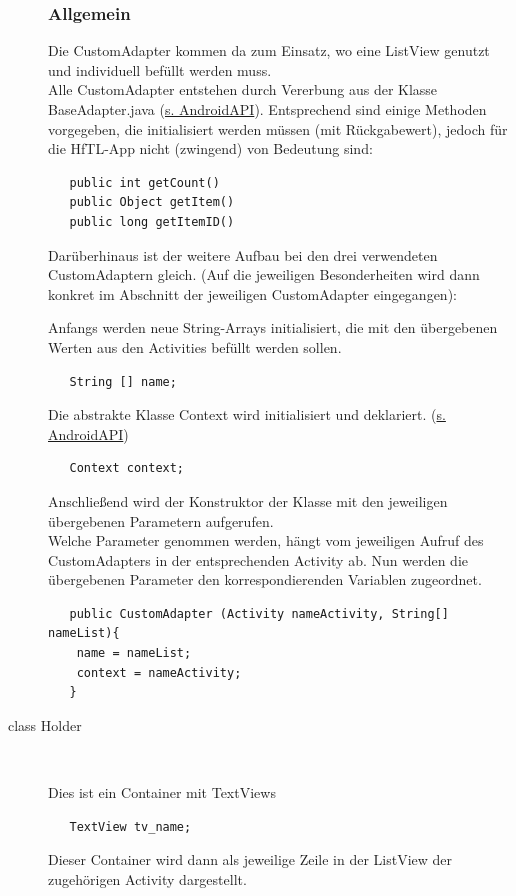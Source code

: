 \begin{description}
\subsubsection{Allgemein} 
Die CustomAdapter kommen da zum Einsatz, wo eine ListView genutzt und individuell befüllt werden muss. \\
Alle CustomAdapter entstehen durch Vererbung aus der Klasse BaseAdapter.java (\href{http://developer.android.com/reference/android/widget/BaseAdapter.html}{s. AndroidAPI}). Entsprechend sind einige Methoden vorgegeben, die initialisiert werden müssen (mit Rückgabewert), jedoch für die HfTL-App nicht (zwingend) von Bedeutung sind:
\begin{lstlisting}
   public int getCount()
   public Object getItem()
   public long getItemID()
\end{lstlisting}

Darüberhinaus ist der weitere Aufbau bei den drei verwendeten CustomAdaptern gleich. (Auf die jeweiligen Besonderheiten wird dann konkret im Abschnitt der jeweiligen CustomAdapter eingegangen):

Anfangs werden neue String-Arrays initialisiert, die mit den übergebenen Werten aus den Activities befüllt werden sollen.
\begin{lstlisting}
   String [] name;
\end{lstlisting}
Die abstrakte Klasse Context wird initialisiert und deklariert. (\href{http://developer.android.com/reference/android/content/Context.html}{s. AndroidAPI})
\begin{lstlisting}
   Context context;
\end{lstlisting}
Anschließend wird der Konstruktor der Klasse mit den jeweiligen übergebenen Parametern aufgerufen. \\ Welche Parameter genommen werden, hängt vom jeweiligen Aufruf des CustomAdapters in der entsprechenden Activity ab.
Nun werden die übergebenen Parameter den korrespondierenden Variablen zugeordnet.

\begin{lstlisting}
   public CustomAdapter (Activity nameActivity, String[] nameList){
    name = nameList;
    context = nameActivity;
   }
\end{lstlisting}


\item [class Holder]~\par
Dies ist ein Container mit TextViews
\begin{lstlisting}
   TextView tv_name;
\end{lstlisting}
Dieser Container wird dann als jeweilige Zeile in der ListView der zugehörigen Activity dargestellt.


\end{description}
